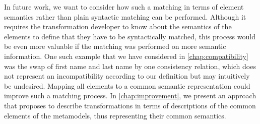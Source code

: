 In future work, we want to consider how such a matching in terms of element semantics rather than plain syntactic matching can be performed. 
Although it requires the transformation developer to know about the semantics of the elements to define that they have to be syntactically matched, this process would be even more valuable if the matching was performed on more semantic information.
One such example that we have considered in \autoref{chap:compatibility} was the swap of first name and last name by one consistency relation, which does not represent an incompatibility according to our definition but may intuitively be undesired.
Mapping all elements to a common semantic representation could improve such a matching process.
In \autoref{chap:improvement}, we present an approach that proposes to describe transformations in terms of descriptions of the common elements of the metamodels, thus representing their common semantics.


